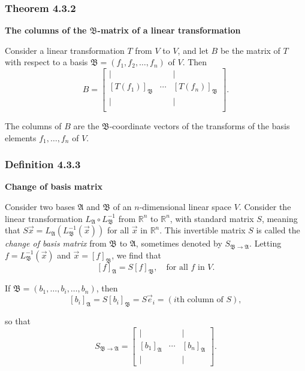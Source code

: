 \documentclass{report}
\begin{document}
\subsubsection*{Theorem 4.3.2}
\par\noindent\textbf{The columns of the $\mathfrak{B}$-matrix of a linear transformation}
\par\noindent Consider a linear transformation $T$ from $V$ to $V$, and let $B$ be the matrix of $T$ with respect to a basis $\mathfrak{B}=(f_{1},f_{2},\ldots{},f_{n})$ of $V$. Then
\[B=\left[\begin{array}{ccc}|&&|\\{} [T(f_{1})]_{\mathfrak{B}}&\cdots{}&[T(f_{n})]_{\mathfrak{B}}\\ |&&|\\ \end{array}\right].\]
\par\noindent The columns of $B$ are the $\mathfrak{B}$-coordinate vectors of the transforms of the basis elements $f_{1},\ldots{},f_{n}$ of $V$.
\subsubsection*{Definition 4.3.3}
\par\noindent\textbf{Change of basis matrix}
\par\noindent Consider two bases $\mathfrak{A}$ and $\mathfrak{B}$ of an $n$-dimensional linear space $V$. Consider the linear transformation $L_{\mathfrak{A}}\circ{}L_{\mathfrak{B}}^{-1}$ from $\mathbb{R}^{n}$ to $\mathbb{R}^{n}$, with standard matrix $S$, meaning that $S\vec{x}=L_{\mathfrak{A}}(L_{\mathfrak{B}}^{-1}(\vec{x}))$ for all $\vec{x}$ in $\mathbb{R}^{n}$. This invertible matrix $S$ is called the \textit{change of basis matrix} from $\mathfrak{B}$ to $\mathfrak{A}$, sometimes denoted by $S_{\mathfrak{B}\rightarrow{}\mathfrak{A}}$. Letting $f=L_{\mathfrak{B}}^{-1}(\vec{x})$ and $\vec{x}=[f]_{\mathfrak{B}}$, we find that
\[[f]_{\mathfrak{A}}=S[f]_{\mathfrak{B}},\quad{}\textrm{for all }f\textrm{ in }V.\]
\par\noindent If $\mathfrak{B}=(b_{1},\ldots{},b_{i},\ldots{},b_{n})$, then
\[[b_{i}]_{\mathfrak{A}}=S[b_{i}]_{\mathfrak{B}}=S\vec{e}_{i}=(i\textrm{th column of }S),\]
\par\noindent so that
\[S_{\mathfrak{B}\rightarrow\mathfrak{A}}=\left[\begin{array}{ccc}|&&|\\{} [b_{1}]_{\mathfrak{A}}&\cdots{}&[b_{n}]_{\mathfrak{A}}\\{} |&&|\end{array}\right].\]
\end{document}
